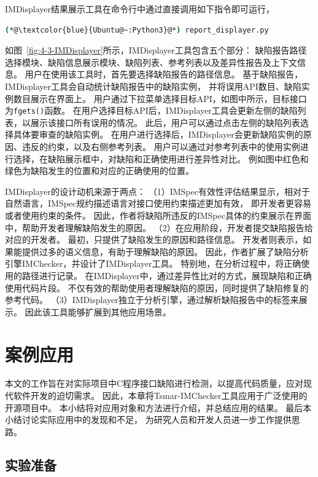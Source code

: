 IMDisplayer结果展示工具在命令行中通过直接调用如下指令即可运行，
\begin{lstlisting}[language={bash},
basicstyle=\linespread{0.8}\listingsfont,
numbers=none,
xleftmargin=.3\textwidth]
(*@\textcolor{blue}{Ubuntu@~:Python3}@*) report_displayer.py
\end{lstlisting}
如图~\ref{fig:4-3-IMDisplayer}所示，IMDisplayer工具包含五个部分：
缺陷报告路径选择模块、缺陷信息展示模块、缺陷列表、参考列表以及差异性报告及上下文信息。
用户在使用该工具时，首先要选择缺陷报告的路径信息。
基于缺陷报告，IMDisplayer工具会自动统计缺陷报告中的缺陷实例，
并将误用API数目、缺陷实例数目展示在界面上。
用户通过下拉菜单选择目标API，如图中所示，目标接口为\texttt{fgets()}函数。
在用户选择目标API后，IMDisplayer工具会更新左侧的缺陷列表，以展示该接口所有误用的情况。
此后，用户可以通过点击左侧的缺陷列表选择具体要审查的缺陷实例。
在用户进行选择后，IMDisplayer会更新缺陷实例的原因、违反的约束，以及右侧参考列表。
用户可以通过对参考列表中的使用实例进行选择，在缺陷展示框中，对缺陷和正确使用进行差异性对比。
例如图中红色和绿色为缺陷发生的位置和对应的正确使用的位置。

IMDisplayer的设计动机来源于两点：
（1）IMSpec有效性评估结果显示，相对于自然语言，IMSpec规约描述语言对接口使用约束描述更加有效，
即开发者更容易或者使用约束的条件。
因此，作者将缺陷所违反的IMSpec具体的约束展示在界面中，帮助开发者理解缺陷发生的原因。
（2）在应用阶段，开发者提交缺陷报告给对应的开发者。
最初，只提供了缺陷发生的原因和路径信息。
开发者则表示，如果能提供过多的语义信息，有助于理解缺陷的原因。
因此，作者扩展了缺陷分析引擎IMChecker，并设计了IMDisplayer工具。
特别地，在分析过程中，将正确使用的路径进行记录。
在IMDisplayer中，通过差异性比对的方式，展现缺陷和正确使用代码片段。
不仅有效的帮助使用者理解缺陷的原因，同时提供了缺陷修复的参考代码。
（3）IMDisplayer独立于分析引擎，通过解析缺陷报告中的标签来展示。
因此该工具能够扩展到其他应用场景。

\section{案例应用}
\label{sec:4.4}
本文的工作旨在对实际项目中C程序接口缺陷进行检测，以提高代码质量，应对现代软件开发的迫切需求。
因此，本章将Tsmar-IMChecker工具应用于广泛使用的开源项目中。
本小结将对应用对象和方法进行介绍，并总结应用的结果。
最后本小结讨论实际应用中的发现和不足，
为研究人员和开发人员进一步工作提供思路。

\subsection{实验准备}
